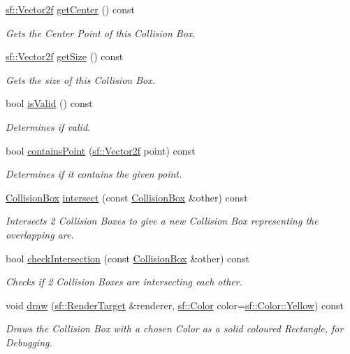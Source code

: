 \begin{DoxyCompactItemize}
\mbox{\hyperlink{classsf_1_1_vector2}{sf\+::\+Vector2f}} \mbox{\hyperlink{class_collision_box_a3f7df7daed5e139af8e81e3eee0be78a}{get\+Center}} () const
\begin{DoxyCompactList}\small\item\em Gets the Center Point of this Collision Box. \end{DoxyCompactList}\item 
\mbox{\hyperlink{classsf_1_1_vector2}{sf\+::\+Vector2f}} \mbox{\hyperlink{class_collision_box_ae75d128f52b9d2e81ad501f1795ead5c}{get\+Size}} () const
\begin{DoxyCompactList}\small\item\em Gets the size of this Collision Box. \end{DoxyCompactList}\item 
bool \mbox{\hyperlink{class_collision_box_a5989c6e2e998994e256ebac3db60aa04}{is\+Valid}} () const
\begin{DoxyCompactList}\small\item\em Determines if valid. \end{DoxyCompactList}\item 
bool \mbox{\hyperlink{class_collision_box_a353e6f98e4af7b7c41fced7073b1a94a}{contains\+Point}} (\mbox{\hyperlink{classsf_1_1_vector2}{sf\+::\+Vector2f}} point) const
\begin{DoxyCompactList}\small\item\em Determines if it contains the given point. \end{DoxyCompactList}\item 
\mbox{\hyperlink{class_collision_box}{Collision\+Box}} \mbox{\hyperlink{class_collision_box_a55b61aaefbd11bcaa68c5ee0c2513d2c}{intersect}} (const \mbox{\hyperlink{class_collision_box}{Collision\+Box}} \&other) const
\begin{DoxyCompactList}\small\item\em Intersects 2 Collision Boxes to give a new Collision Box representing the overlapping are. \end{DoxyCompactList}\item 
bool \mbox{\hyperlink{class_collision_box_ae5212d62ab28db3e42b17407d2ba98c0}{check\+Intersection}} (const \mbox{\hyperlink{class_collision_box}{Collision\+Box}} \&other) const
\begin{DoxyCompactList}\small\item\em Checks if 2 Collision Boxes are intersecting each other. \end{DoxyCompactList}\item 
void \mbox{\hyperlink{class_collision_box_abee978cea9227faf969b9c18383771f8}{draw}} (\mbox{\hyperlink{classsf_1_1_render_target}{sf\+::\+Render\+Target}} \&renderer, \mbox{\hyperlink{classsf_1_1_color}{sf\+::\+Color}} color=\mbox{\hyperlink{classsf_1_1_color_af8896b5f56650935f5b9d72d528802c7}{sf\+::\+Color\+::\+Yellow}}) const
\begin{DoxyCompactList}\small\item\em Draws the Collision Box with a chosen Color as a solid coloured Rectangle, for Debugging. \end{DoxyCompactList}\end{DoxyCompactItemize}
